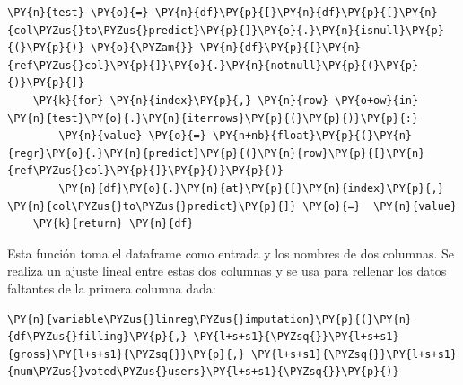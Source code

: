 \begin{tcolorbox}[breakable, size=fbox, boxrule=1pt, pad at break*=1mm,colback=cellbackground, colframe=cellborder]
\begin{Verbatim}[commandchars=\\\{\}]
    \PY{n}{test} \PY{o}{=} \PY{n}{df}\PY{p}{[}\PY{n}{df}\PY{p}{[}\PY{n}{col\PYZus{}to\PYZus{}predict}\PY{p}{]}\PY{o}{.}\PY{n}{isnull}\PY{p}{(}\PY{p}{)} \PY{o}{\PYZam{}} \PY{n}{df}\PY{p}{[}\PY{n}{ref\PYZus{}col}\PY{p}{]}\PY{o}{.}\PY{n}{notnull}\PY{p}{(}\PY{p}{)}\PY{p}{]}
    \PY{k}{for} \PY{n}{index}\PY{p}{,} \PY{n}{row} \PY{o+ow}{in} \PY{n}{test}\PY{o}{.}\PY{n}{iterrows}\PY{p}{(}\PY{p}{)}\PY{p}{:}
        \PY{n}{value} \PY{o}{=} \PY{n+nb}{float}\PY{p}{(}\PY{n}{regr}\PY{o}{.}\PY{n}{predict}\PY{p}{(}\PY{n}{row}\PY{p}{[}\PY{n}{ref\PYZus{}col}\PY{p}{]}\PY{p}{)}\PY{p}{)}
        \PY{n}{df}\PY{o}{.}\PY{n}{at}\PY{p}{[}\PY{n}{index}\PY{p}{,} \PY{n}{col\PYZus{}to\PYZus{}predict}\PY{p}{]} \PY{o}{=}  \PY{n}{value}
    \PY{k}{return} \PY{n}{df}
\end{Verbatim}
\end{tcolorbox}

    Esta función toma el dataframe como entrada y los nombres de dos
columnas. Se realiza un ajuste lineal entre estas dos columnas y se usa
para rellenar los datos faltantes de la primera columna dada:

    \begin{tcolorbox}[breakable, size=fbox, boxrule=1pt, pad at break*=1mm,colback=cellbackground, colframe=cellborder]
\begin{Verbatim}[commandchars=\\\{\}]
\PY{n}{variable\PYZus{}linreg\PYZus{}imputation}\PY{p}{(}\PY{n}{df\PYZus{}filling}\PY{p}{,} \PY{l+s+s1}{\PYZsq{}}\PY{l+s+s1}{gross}\PY{l+s+s1}{\PYZsq{}}\PY{p}{,} \PY{l+s+s1}{\PYZsq{}}\PY{l+s+s1}{num\PYZus{}voted\PYZus{}users}\PY{l+s+s1}{\PYZsq{}}\PY{p}{)}
\end{Verbatim}
\end{tcolorbox}

